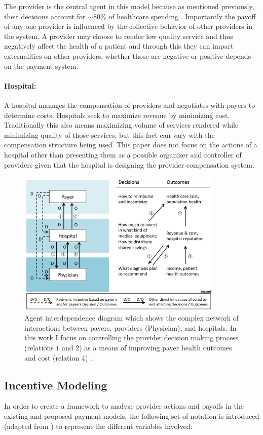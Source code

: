 \documentclass{article}
\begin{document}
The provider is the central agent in this model because as mentioned previously, their decisions account for ${\sim}80$\% of healthcare spending \cite{trust}. Importantly the payoff of any one provider is influenced by the collective behavior of other providers in the system. A provider may choose to render low quality service and thus negatively affect the health of a patient and through this they can impart externalities on other providers, whether those are negative or positive depends on the payment system.

\paragraph{Hospital:}A hospital manages the compensation of providers and negotiates with payers to determine costs. Hospitals seek to maximize revenue by minimizing cost. Traditionally this also means maximizing volume of services rendered while minimizing quality of those services, but this fact can vary with the compensation structure being used. This paper does not focus on the actions of a hospital other than presenting them as a possible organizer and controller of providers given that the hospital is designing the provider compensation system.

\begin{figure}[H]
\includegraphics[height=7cm]{agentdep}
\centering
\caption{Agent interdependence diagram which shows the complex network of interactions between payers, providers (Physician), and hospitals. In this work I focus on controlling the provider decision making process (relations $1$ and $2$) as a means of improving payer health outcomes and cost (relation $4$) \cite{msdt}.}
\label{fig:agentdep}
\end{figure}

\subsection{Incentive Modeling} \label{sec:modeling}
In order to create a framework to analyze provider actions and payoffs in the existing and proposed payment models, the following set of notation is introduced (adapted from \cite{trust}\cite{blended}) to represent the different variables involved:
\end{document}
